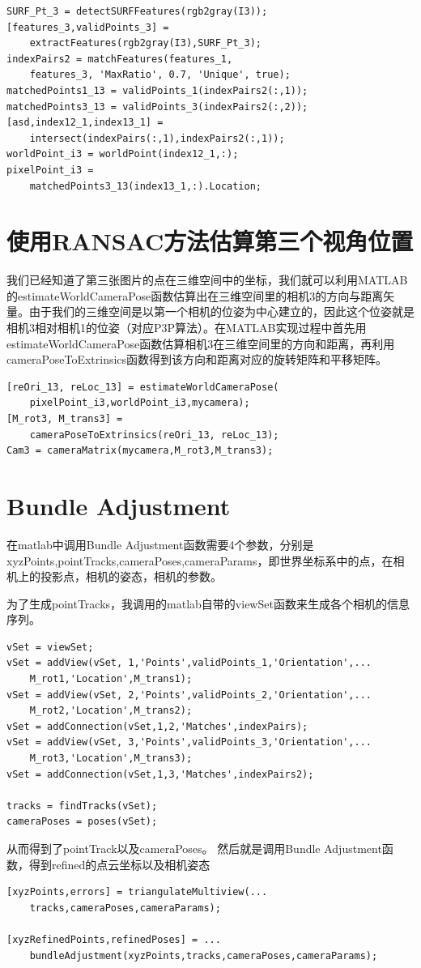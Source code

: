 \begin{lstlisting}
SURF_Pt_3 = detectSURFFeatures(rgb2gray(I3));
[features_3,validPoints_3] = 
    extractFeatures(rgb2gray(I3),SURF_Pt_3);
indexPairs2 = matchFeatures(features_1, 
    features_3, 'MaxRatio', 0.7, 'Unique', true);
matchedPoints1_13 = validPoints_1(indexPairs2(:,1));
matchedPoints3_13 = validPoints_3(indexPairs2(:,2));
[asd,index12_1,index13_1] = 
    intersect(indexPairs(:,1),indexPairs2(:,1));
worldPoint_i3 = worldPoint(index12_1,:);
pixelPoint_i3 = 
    matchedPoints3_13(index13_1,:).Location;
\end{lstlisting}


\section{使用RANSAC方法估算第三个视角位置}
我们已经知道了第三张图片的点在三维空间中的坐标，我们就可以利用MATLAB的estimateWorldCameraPose函数估算出在三维空间里的相机3的方向与距离矢量。由于我们的三维空间是以第一个相机的位姿为中心建立的，因此这个位姿就是相机3相对相机1的位姿（对应P3P算法）。在MATLAB实现过程中首先用estimateWorldCameraPose函数估算相机3在三维空间里的方向和距离，再利用cameraPoseToExtrinsics函数得到该方向和距离对应的旋转矩阵和平移矩阵。

\begin{lstlisting}
[reOri_13, reLoc_13] = estimateWorldCameraPose(
    pixelPoint_i3,worldPoint_i3,mycamera);
[M_rot3, M_trans3] = 
    cameraPoseToExtrinsics(reOri_13, reLoc_13);
Cam3 = cameraMatrix(mycamera,M_rot3,M_trans3);
\end{lstlisting}
    

\section{Bundle Adjustment}
在matlab中调用Bundle Adjustment函数需要4个参数，分别是xyzPoints,pointTracks,cameraPoses,cameraParams，即世界坐标系中的点，在相机上的投影点，相机的姿态，相机的参数。

为了生成pointTracks，我调用的matlab自带的viewSet函数来生成各个相机的信息序列。

\begin{lstlisting}
vSet = viewSet;
vSet = addView(vSet, 1,'Points',validPoints_1,'Orientation',...
    M_rot1,'Location',M_trans1);
vSet = addView(vSet, 2,'Points',validPoints_2,'Orientation',...
    M_rot2,'Location',M_trans2);
vSet = addConnection(vSet,1,2,'Matches',indexPairs);
vSet = addView(vSet, 3,'Points',validPoints_3,'Orientation',...
    M_rot3,'Location',M_trans3);
vSet = addConnection(vSet,1,3,'Matches',indexPairs2);

tracks = findTracks(vSet);
cameraPoses = poses(vSet);
\end{lstlisting}

从而得到了pointTrack以及cameraPoses。
然后就是调用Bundle Adjustment函数，得到refined的点云坐标以及相机姿态
\begin{lstlisting}
[xyzPoints,errors] = triangulateMultiview(...
    tracks,cameraPoses,cameraParams);

[xyzRefinedPoints,refinedPoses] = ...
    bundleAdjustment(xyzPoints,tracks,cameraPoses,cameraParams);
\end{lstlisting}
